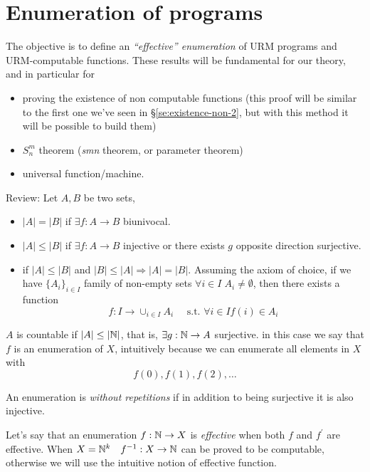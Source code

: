 \chapter{Enumeration of programs}
\newcommand{\pr}{\mathcal{PR}}
The objective is to define an \emph{``effective'' enumeration} of URM
programs and URM-computable functions. These results will be
fundamental for our theory, and in particular for
\begin{itemize}
\item proving the existence of non computable functions (this proof will
  be similar to the first one we've seen in
  \S\ref{se:existence-non-2}, but with this method it will be possible to
  build them)
\item $S^m_n$ theorem (\textit{smn} theorem, or parameter theorem)
  \item universal function/machine.
\end{itemize}

Review: Let $ A, B $ be two sets,
\begin{itemize}
\item $ |A| = |B| $ if $ \exists f:A\rightarrow B $ biunivocal.

\item $ |A| \leq |B| $ if $ \exists f:A\rightarrow B $ injective or
  there exists $g$ opposite direction surjective.

\item if $|A| \leq |B|$ and $|B| \leq |A| \Rightarrow |A|=|B|$.
  Assuming the axiom of choice, if we have $\{A_i\}_{i \in I}$ family
  of non-empty sets $\forall i \in I \; A_i \neq \emptyset$, then
  there exists a function $$f:I \rightarrow \cup_{i \in I}A_i \quad
  \text{ s.t. }  \forall i \in I f(i) \in A_i$$
\end{itemize}

$A$ is countable if $ |A| \leq |\mathbb{N}| $, that is,
$ \exists g: \mathbb{N} \rightarrow A $ surjective. in this case we say that
$f$ is an enumeration of $X$, intuitively because we can enumerate all
elements in $X$ with \[f(0), f(1), f(2), \dots \]

An enumeration is \emph{without repetitions} if in addition to being
surjective it is also injective.

Let's say that an enumeration $f: \mathbb{N} \rightarrow X$ is
\emph{effective} when both $f$ and $f^\prime$ are effective. When
$X = \mathbb{N}^k \quad f^{-1}: X \rightarrow \mathbb{N}$ can be proved to be
computable, otherwise we will use the intuitive notion of effective
function.

